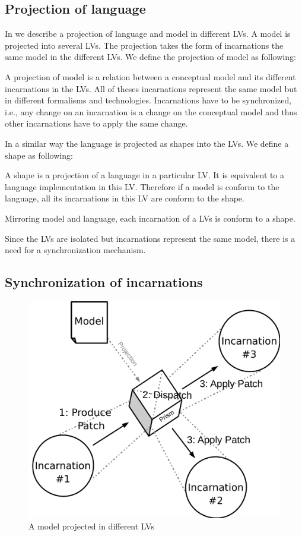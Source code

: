 \subsection{Projection of language}
In  we describe a projection of language and model in different LVs.
A model is projected into several LVs.
The projection takes the form of incarnations the same model in the different LVs.
We define the projection of model as following:
\begin{definition}
A projection of model is a relation between a conceptual model and its different incarnations in the LVs.
All of theses incarnations represent the same model but in different formalisms and technologies.
Incarnations have to be synchronized, i.e., any change on an incarnation is a change on the conceptual model and thus other incarnations have to apply the same change.
\end{definition}
In a similar way the language is projected as shapes into the LVs.
We define a shape as following:
\begin{definition}
A shape is a projection of a language in a particular LV.
It is equivalent to a language implementation in this LV.
Therefore if a model is conform to the language, all its incarnations in this LV are conform to the shape.
\end{definition}
Mirroring model and language, each incarnation of a LVs is conform to a shape.

Since the LVs are isolated but incarnations represent the same model, there is a need for a synchronization mechanism.



\subsection{Synchronization of incarnations}

\begin{figure}[bt]
	\centering
	\includegraphics[width=.6\columnwidth]{figures/prism}
	\caption{A model projected in different LVs}
	\label{fig:prism}
\end{figure}

